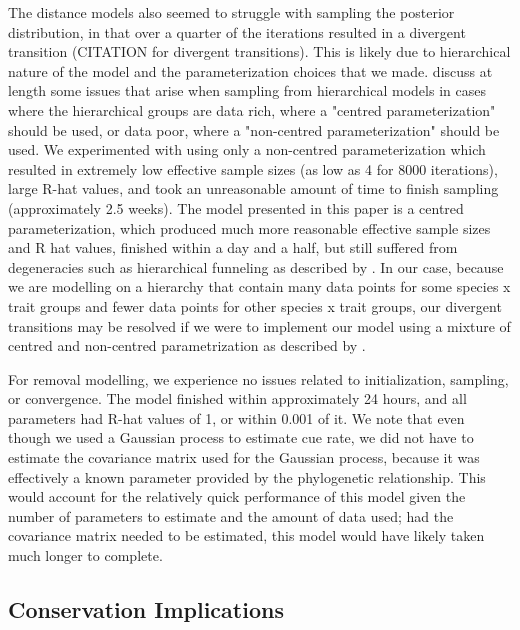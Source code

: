 \documentclass[12pt]{article}
\begin{document}
\par The distance models also seemed to struggle with sampling the posterior distribution, in that over a quarter of the iterations resulted in a divergent transition (CITATION for divergent transitions).
This is likely due to hierarchical nature of the model and the parameterization choices that we made.
\citet{betancourt_hierarchical_2020} discuss at length some issues that arise when sampling from hierarchical models in cases where the hierarchical groups are data rich, where a "centred parameterization" should be used, or data poor, where a "non-centred parameterization" should be used.
We experimented with using only a non-centred parameterization which resulted in extremely low effective sample sizes (as low as 4 for 8000 iterations), large R-hat values, and took an unreasonable amount of time to finish sampling (approximately 2.5 weeks).
The model presented in this paper is a centred parameterization, which produced much more reasonable effective sample sizes and R hat values, finished within a day and a half, but still suffered from degeneracies such as hierarchical funneling as described by \citet{betancourt_hierarchical_2020}.
In our case, because we are modelling on a hierarchy that contain many data points for some species x trait groups and fewer data points for other species x trait groups, our divergent transitions may be resolved if we were to implement our model using a mixture of centred and non-centred parametrization as described by \citet{betancourt_hierarchical_2020}.

\par For removal modelling, we experience no issues related to initialization, sampling, or convergence. 
The model finished within approximately 24 hours, and all parameters had R-hat values of 1, or within 0.001 of it.
We note that even though we used a Gaussian process to estimate cue rate, we did not have to estimate the covariance matrix used for the Gaussian process, because it was effectively a known parameter provided by the phylogenetic relationship.
This would account for the relatively quick performance of this model given the number of parameters to estimate and the amount of data used; had the covariance matrix needed to be estimated, this model would have likely taken much longer to complete.

\subsection{Conservation Implications}



\end{document}
